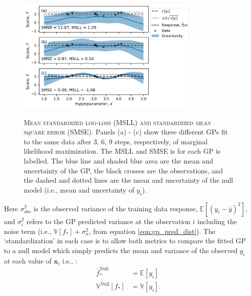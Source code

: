 \begin{figure}
    \centering
    \caption[Mean standardized log-loss (MSLL) and standardized mean square error (SMSE)]{\textsc{Mean standardized log-loss (MSLL) and standardized mean square error (SMSE)}. Panels (a) - (c) show three different GPs fit to the same data after 3, 6, 9 steps, respectively, of marginal likelihood maximization. The MSLL and SMSE is for each GP is labelled. The blue line and shaded blue area are the mean and uncertainty of the GP, the black crosses are the observations, and the dashed and dotted lines are the mean and uncertainty of the null model (i.e., mean and uncertainty of $y_{i}$).}
    \includegraphics[width=0.8\textwidth]{chapters/msm_optimization/figures/gp_metric_explainer.png}
    \label{fig:msm_gp_metric_explainer}
\end{figure}

Here $\sigma_{obs}^{2}$ is the observed variance of the training data response, $\mathbb{E}\left[(y_{i}-\bar{y})^{2}\right]$, and $\sigma_{i}^{2}$ refers to the GP predicted variance at the observation $i$ including the noise term (i.e., $\mathbb{V}\left[f_{*}\right]+\sigma_{n}^{2}$, from equation \ref{eqn:gp_pred_dist}).  The `standardization' in each case is to allow both metrics to compare the fitted GP to a null model which simply predicts the mean and variance of the observed $y_{i}$ at each value of $\mathbf{x}_{i}$ i.e., \cite{rasmussenGaussianProcessesMachine2006}:
\begin{equation}\label{eqn:gp_null}
\begin{aligned}
\bar{f}^{\mathrm{Null}}_{*} &= \mathbb{E}\left[y_{i}\right] \\
\mathbb{V}^{\mathrm{Null}}\left[f_{*}\right] &= \mathbb{V}\left[y_{i}\right].
\end{aligned}
\end{equation}

